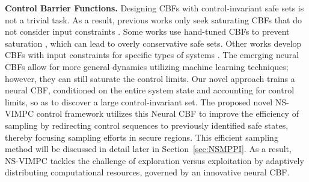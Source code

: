 \noindent\textbf{Control Barrier Functions.} 
Designing CBFs with control-invariant safe sets is not a trivial task. As a result, previous works only seek saturating CBFs that do not consider input constraints \cite{Robotarium, lindemann2018control, xu2018safe}. Some works use hand-tuned CBFs to prevent saturation \cite{wei2022safe, clark2021verification}, which can lead to overly conservative safe sets. Other works develop CBFs with input constraints for specific types of systems \cite{cortez2022safe, cortez2021robust}. The emerging neural CBFs \cite{zhang2023neural, yu2023sequential, qin2021learning, zhang2024gcbf+} allow for more general dynamics utilizing machine learning techniques; however, they can still saturate the control limits. 
Our novel approach trains a neural CBF, conditioned on the entire system state and accounting for control limits,  so as to discover a large control-invariant set. 
The proposed novel NS-VIMPC control framework utilizes this Neural CBF to improve the efficiency of sampling by redirecting control sequences to previously identified safe states, thereby focusing sampling efforts in secure regions. 
This efficient sampling method will be discussed in detail later in Section~\ref{sec:NSMPPI}. 
 As a result, NS-VIMPC tackles the challenge of exploration versus exploitation by adaptively distributing computational resources, governed by an innovative neural CBF.